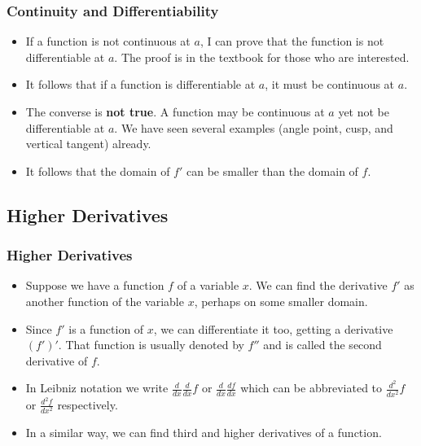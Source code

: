 \documentclass[serif,ignorenonframetext]{beamer}
\newcommand{\ds}{\displaystyle}
\begin{document}
\begin{frame}
  \frametitle{Continuity and Differentiability}
  \begin{itemize}
  \item If a function is not continuous at $a$, I can prove that the function
    is not differentiable at $a$.  The proof is in the textbook for those
    who are interested.
  \pause
  \item It follows that if a function is differentiable at $a$, it must be
    continuous at $a$.
  \pause
  \item The converse is \textbf{not true}.  A function may be continuous
    at $a$ yet not be differentiable at $a$.  We have seen several examples
    (angle point, cusp, and vertical tangent) already.
  \pause
  \item It follows that
    the domain of $f'$ can be smaller than the domain of $f$.
  \end{itemize}
\end{frame}


\subsection{Higher Derivatives}

\begin{frame}
  \frametitle{Higher Derivatives}
  \begin{itemize}
  \item Suppose we have a function $f$ of a variable $x$.  
    We can find the derivative $f'$ as another function of the variable $x$,
    perhaps on some smaller domain.
  \pause
  \item Since $f'$ is a function of $x$, we can differentiate it too,
    getting a derivative $(f')'$.  That function is usually denoted by
    $f''$ and is called the second derivative of $f$.
  \pause
  \item In Leibniz notation we write $\ds \frac{d}{dx} \frac{d}{dx} f$
    or $\ds \frac{d}{dx} \frac{df}{dx}$ which can be abbreviated to
    $\ds \frac{d^2}{dx^2} f$ or $\ds \frac{d^2f}{dx^2}$ respectively.
  \pause
  \item In a similar way, we can find third and higher derivatives of
    a function.
  \end{itemize}
\end{frame}
\end{document}
